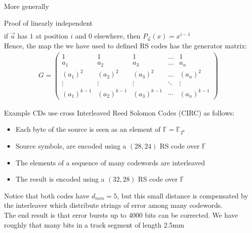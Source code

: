 \begin{parag}{More generally}
\begin{subparag}{Proof of linearly independent}
\begin{align*}
        \end{align*}
        if $\vec{u}$ has $1$ at position $i$ and $0$ elsewhere, then $P_{\vec{u}}\left(x\right) =  x^{i-1}$\\
        Hence, the map the we have used to defined RS codes has the generator matrix:
        \begin{align*} 
            G =  \begin{pmatrix} 1 & 1 & 1 & \ldots & 1 \\ a_1 & a_2 & a_3 & \ldots & a_n \\ \left(a_1\right)^2 & \left(a_2\right)^2 & \left(a_3\right)^2 & \ldots & \left(a_n\right)^2 \\ \vdots & \vdots & \vdots & \ddots & \vdots\\ \left(a_1\right)^{k-1} & \left(a_2\right)^{k-1} & \left(a_3\right)^{k-1} & \cdots & \left(a_n\right)^{k-1}
            \end{pmatrix} 
        \end{align*}
    \end{subparag}
\end{parag}
\begin{parag}{Example}
    CDs use cross Interleaved Reed Solomon Codes (CIRC) as follows:
    \begin{itemize}
        \item Each byte of the source is seen as an element of $\mathbb{F} =  \mathbb{F}_{2^8}$
        \item Source symbols, are encoded using a $\left(28, 24\right)$ RS code over $\mathbb{F}$
        \item The elements of a sequence of many codewords are interleaved
        \item The result is encoded using a $\left(32, 28\right)$ RS code over $\mathbb{F}$
    \end{itemize}
    
    Notice that both codes have $d_{min} = 5$, but this small distance is compensated by the interleaver which distribute strings of error among many codewords.\\
    The end result is that error bursts up to 4000 bits can be corrected. We have roughly that many bits in a track segment of length 2.5mm
\end{parag}

